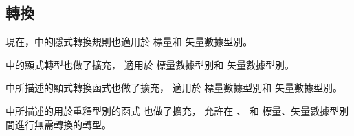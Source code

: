 \subsection{轉換}

現在，中的隱式轉換規則也適用於  標量和  矢量數據型別。

中的顯式轉型也做了擴充，
適用於  標量數據型別和  矢量數據型別。

中所描述的顯式轉換函式也做了擴充，
適用於  標量數據型別和  矢量數據型別。

中所描述的用於重釋型別的函式  也做了擴充，
允許在 、  和  標量、矢量數據型別間進行無需轉換的轉型。
